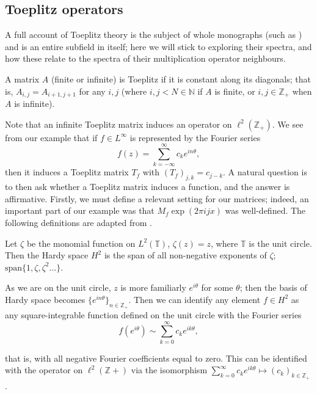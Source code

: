 \documentclass[../main.tex]{subfiles}
\begin{document}
\subsection{Toeplitz operators}\label{sec:toeplitz}

A full account of Toeplitz theory is the subject
of whole monographs (such as \parencite{bottcher1990analysis}) and is an entire
subfield in itself; here we will stick to exploring their spectra, and how these
relate to the spectra of their multiplication operator neighbours. 

\begin{definition}
  A matrix $A$ (finite or infinite) is Toeplitz if it is constant along its
  diagonals; that is, $A_{i,j} = A_{i+1,j+1}$ for any $i, j$ (where $i,j <
  N \in \mathbb{N}$ if $A$ is finite, or $i,j \in \mathbb{Z}_+$ when $A$
  is infinite).
\end{definition}

Note that an infinite Toeplitz matrix induces an operator on
$\ell^2(\mathbb{Z}_+)$. We see from our example that if $f \in L^\infty$ is
represented by the Fourier series
$$f(z) = \sum_{k=-\infty}^{\infty} c_k e^{i n \theta},$$
then it induces a Toeplitz matrix $T_f$ with $(T_f)_{j,k} = c_{j-k}$. A natural
question is to then ask whether a Toeplitz matrix induces a function, and the
answer is affirmative. Firstly, we must define a relevant setting for our
matrices; indeed, an important part of our
example was that $M_f \exp(2 \pi i j x)$ was well-defined. The following
definitions are adapted from \parencite{arveson2002short}.

\begin{definition}
  Let $\zeta$ be the monomial function on $L^2(\mathbb{T})$, $\zeta(z) = z$, where
  $\mathbb{T}$ is the unit circle. Then the Hardy space $H^2$ is the span
  of all non-negative exponents of $\zeta$; $\text{span}\{1, \zeta,
  \zeta^2 \hdots\}$.
\end{definition}

As we are on the unit circle, $z$ is more familiarly $e^{i \theta}$ for some
$\theta$; then the basis of Hardy space becomes $\{e^{i n \theta}\}_{n \in
\mathbb{Z}_+}$. Then we can identify any element $f \in H^2$ as any
square-integrable function defined on the unit circle with the Fourier series
$$f(e^{i \theta}) \sim \sum_{k=0}^\infty c_k e^{i k \theta},$$

that is, with all negative Fourier coefficients equal to zero. This can be
identified with the operator on $\ell^2(\mathbb{Z}+)$ via the isomorphism
$\sum_{k=0}^\infty c_k e^{i k \theta} \mapsto (c_k)_{k \in \mathbb{Z}_+}$
\parencite{bottcher1990analysis}.
\end{document}
